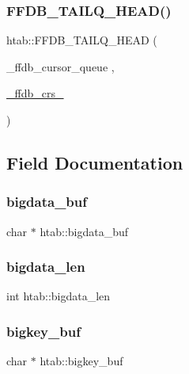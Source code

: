 \mbox{\label{structhtab_af19d4f4f4be39bcc1bca0509bef5c3cf}} 
\subsubsection{\texorpdfstring{FFDB\_TAILQ\_HEAD()}{FFDB\_TAILQ\_HEAD()}\hspace{0.1cm}{\footnotesize\ttfamily [2/2]}}
{\footnotesize\ttfamily htab\+::\+F\+F\+D\+B\+\_\+\+T\+A\+I\+L\+Q\+\_\+\+H\+E\+AD (\begin{DoxyParamCaption}\item[{\+\_\+ffdb\+\_\+cursor\+\_\+queue}]{,  }\item[{\mbox{\hyperlink{struct__ffdb__crs__}{\+\_\+ffdb\+\_\+crs\+\_\+}}}]{ }\end{DoxyParamCaption})}



\subsection{Field Documentation}
\mbox{\label{structhtab_a5dab77daa04419ec7a918dac8c792cdd}} 
\subsubsection{\texorpdfstring{bigdata\_buf}{bigdata\_buf}}
{\footnotesize\ttfamily char $\ast$ htab\+::bigdata\+\_\+buf}

\mbox{\label{structhtab_a6c9a0fed7b96ac07dbe0d82a9cfdeb29}} 
\subsubsection{\texorpdfstring{bigdata\_len}{bigdata\_len}}
{\footnotesize\ttfamily int htab\+::bigdata\+\_\+len}

\mbox{\label{structhtab_a345c469a2f086b60d390dc74c086d323}} 
\subsubsection{\texorpdfstring{bigkey\_buf}{bigkey\_buf}}
{\footnotesize\ttfamily char $\ast$ htab\+::bigkey\+\_\+buf}

